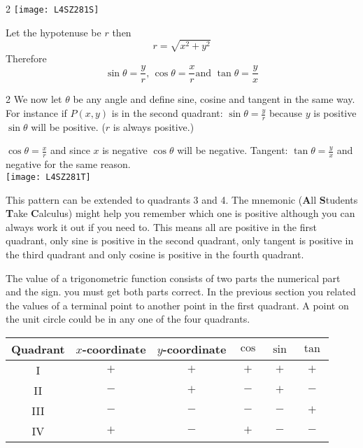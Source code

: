 \begin {multicols}{2}
\texttt{[image: L4SZ281S]}

Let the hypotenuse be $r$ then
\begin{equation*}r =\sqrt{x^{2} +y^{2}}
\end{equation*}
Therefore
\begin{equation*}\sin  \theta  =\frac{y}{r}\text{, }\cos  \theta  =\frac{x}{r}\text{and }\tan  \theta  =\frac{y}{x}
\end{equation*}
\end {multicols}
\begin {multicols}{2}
We now let $\theta $ be any angle and define sine, cosine and tangent in the same way. For instance if $P (x ,y)$ is in the second quadrant: $\sin  \theta  =\frac{y}{r}$ because $y$ is positive $\sin  \theta $ will be positive. ($r$ is always positive.) 

$\cos  \theta  =\frac{x}{r}$ and since $x$ is negative $\cos  \theta $ will be negative. Tangent: $\tan  \theta  =\frac{y}{x}$ and negative for the same reason.\\
\texttt{[image: L4SZ281T]}
\end{multicols}

This pattern can be extended to quadrants 3 and 4. The mnemonic (\textbf{A}ll \textbf{S}tudents \textbf{T}ake \textbf{C}alculus) might help you remember which one is positive although you can always work it out if you need to. This means all are positive in the first quadrant, only sine is positive in the second quadrant, only tangent is positive in the third quadrant and only cosine is positive in the fourth quadrant.

The value of a trigonometric function consists of two parts the numerical part and the sign. you must get both parts correct. In the previous section you related the values of a terminal point to another point in the first quadrant. A point on the unit circle could be in any one of the four quadrants. 

\qquad \qquad \qquad \qquad
\begin{tabular}{cccccc}\toprule
	Quadrant  & $x$-coordinate  & $y$-coordinate  & $\cos $  & $\sin $  & $\tan $  \\\midrule
	I  & $ +$  & $ +$  & $ +$  & $ +$  & $ +$  \\\midrule
	II  & $ -$  & $ +$  & $ -$  & $ +$  & $ -$  \\\midrule
	III  & $ -$  & $ -$  & $ -$  & $ -$  & $ +$  \\\midrule
	IV  & $ +$  & $ -$  & $ +$  & $ -$  & $ -$  \\\bottomrule
\end{tabular}

